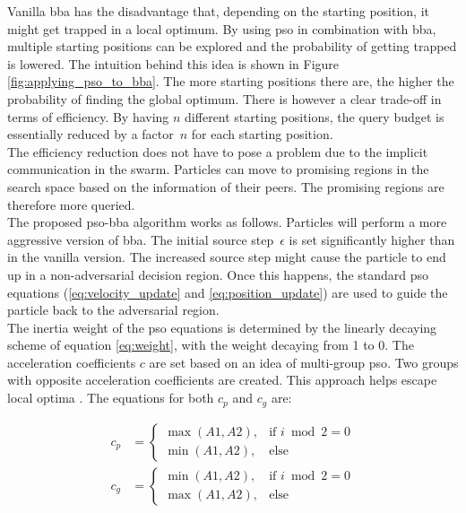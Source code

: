 Vanilla \gls{bba} has the disadvantage that, depending on the starting position, it might get trapped in a local optimum. By using \gls{pso} in combination with \gls{bba}, multiple starting positions can be explored and the probability of getting trapped is lowered. The intuition behind this idea is shown in Figure \ref{fig:applying_pso_to_bba}. The more starting positions there are, the higher the probability of finding the global optimum. There is however a clear trade-off in terms of efficiency. By having $n$ different starting positions, the query budget is essentially reduced by a factor~$n$ for each starting position.\\

The efficiency reduction does not have to pose a problem due to the implicit communication in the swarm. Particles can move to promising regions in the search space based on the information of their peers. The promising regions are therefore more queried.\\ 

The proposed \gls{pso}-\gls{bba} algorithm works as follows. Particles will perform a more aggressive version of \gls{bba}. The initial source step~$\epsilon$ is set significantly higher than in the vanilla version. The increased source step might cause the particle to end up in a non-adversarial decision region. Once this happens, the standard \gls{pso} equations (\ref{eq:velocity_update} and \ref{eq:position_update}) are used to guide the particle back to the adversarial region.\\

The inertia weight of the \gls{pso} equations is determined by the linearly decaying scheme of equation \ref{eq:weight}, with the weight decaying from 1 to 0. The acceleration coefficients $c$ are set based on an idea of multi-group \gls{pso}. Two groups with opposite acceleration coefficients are created. This approach helps escape local optima \cite{opposite_cs}. The equations for both $c_p$ and $c_g$ are:

\begin{align*}
c_p &= 
\begin{cases}
	\max(A1, A2), &\text{if } i\bmod 2 = 0\\
	\min(A1, A2), &\text{else}
\end{cases}\\
c_g &=
\begin{cases}
	\min(A1, A2), &\text{if } i\bmod 2 = 0\\
	\max(A1, A2), &\text{else}
\end{cases}\\
\end{align*} 

